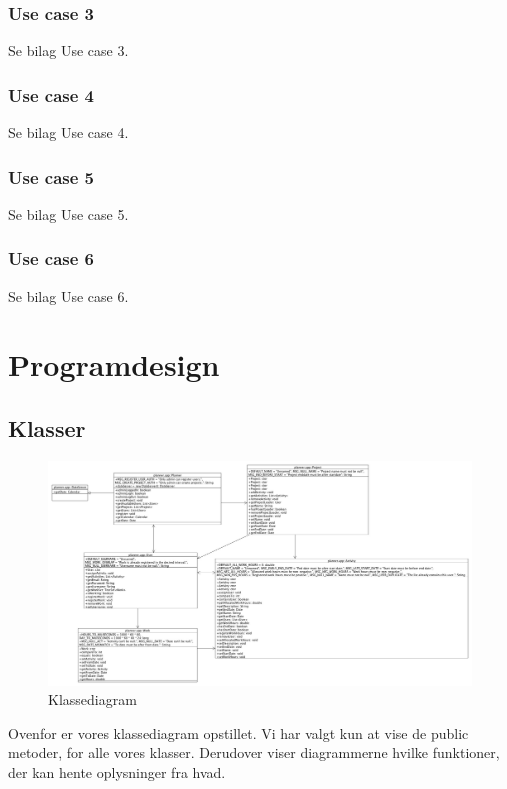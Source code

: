 \documentclass[a4paper,12pt]{article}
\begin{document}
\subsubsection*{Use case 3}
Se bilag Use case 3.
\subsubsection*{Use case 4}
Se bilag Use case 4.
\subsubsection*{Use case 5}
Se bilag Use case 5.
\subsubsection*{Use case 6}
Se bilag Use case 6.
\newpage
\section{Programdesign}
\subsection{Klasser}
\begin{figure}[htp]
\centering
\includegraphics[scale=0.25]{classdiagram.jpg}
\caption{Klassediagram}
\label{fig: Klassediagram}
\end{figure}
Ovenfor er vores klassediagram opstillet. Vi har valgt kun at vise de public metoder, for alle vores klasser. Derudover viser diagrammerne hvilke funktioner, der kan hente oplysninger fra hvad.
\newpage
\end{document}
